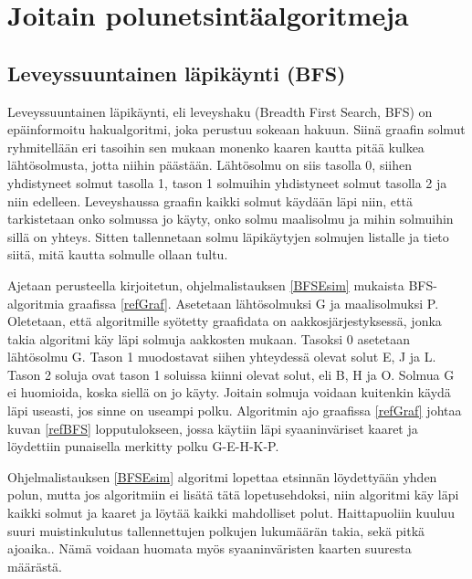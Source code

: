\chapter{Joitain polunetsintäalgoritmeja}\label{joitainP}

\section{Leveyssuuntainen läpikäynti (BFS)}\label{bfs}
Leveyssuuntainen läpikäynti, eli leveyshaku (Breadth First Search, BFS) on 
epäinformoitu hakualgoritmi, joka perustuu sokeaan 
hakuun.\cite{applSciLawande} Siinä graafin solmut ryhmitellään eri tasoihin 
sen mukaan monenko kaaren kautta pitää kulkea lähtösolmusta, jotta niihin 
päästään. Lähtösolmu on siis tasolla 0, siihen yhdistyneet solmut tasolla 1, 
tason 1 solmuihin yhdistyneet solmut tasolla 2 ja niin edelleen. 
Leveyshaussa graafin kaikki solmut käydään läpi niin, että tarkistetaan 
onko solmussa jo käyty, onko solmu maalisolmu ja mihin solmuihin sillä on 
yhteys. Sitten tallennetaan solmu läpikäytyjen solmujen listalle ja tieto 
siitä, mitä kautta solmulle ollaan tultu.\cite{BFSRahim} \par
	Ajetaan \textcite{applSciLawande} perusteella 
kirjoitetun, ohjelmalistauksen \ref{BFSEsim} mukaista BFS-algoritmia graafissa 
\ref{refGraf}. Asetetaan lähtösolmuksi G ja maalisolmuksi P. Oletetaan, että 
algoritmille syötetty graafidata on aakkosjärjestyksessä, jonka takia 
algoritmi käy läpi solmuja aakkosten mukaan. Tasoksi 0 asetetaan lähtösolmu G. 
Tason 1 muodostavat siihen yhteydessä olevat solut E, J ja L. Tason 2 soluja 
ovat tason 1 soluissa kiinni olevat solut, eli B, H ja O. Solmua G ei 
huomioida, koska siellä on jo käyty. Joitain solmuja voidaan kuitenkin käydä 
läpi useasti, jos sinne on useampi polku. Algoritmin ajo graafissa 
\ref{refGraf} johtaa kuvan \ref{refBFS} lopputulokseen, jossa käytiin läpi 
syaaninväriset kaaret ja löydettiin punaisella merkitty polku G-E-H-K-P. \par
	Ohjelmalistauksen \ref{BFSEsim} algoritmi lopettaa etsinnän 
löydettyään yhden polun, mutta jos algoritmiin ei lisätä tätä lopetusehdoksi, 
niin algoritmi käy läpi kaikki solmut ja kaaret ja löytää kaikki mahdolliset 
polut.\cite{BFSRahim} Haittapuoliin kuuluu suuri muistinkulutus tallennettujen 
polkujen lukumäärän takia,\cite{BFSRahim} sekä pitkä 
ajoaika.\cite{mazeGameTrilogi}. Nämä voidaan huomata myös syaaninväristen 
kaarten suuresta määrästä.


